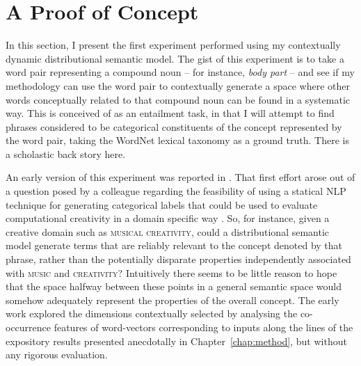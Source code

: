\section{A Proof of Concept}
In this section, I present the first experiment performed using my contextually dynamic distributional semantic model.  The gist of this experiment is to take a word pair representing a compound noun -- for instance, \emph{body part} -- and see if my methodology can use the word pair to contextually generate a space where other words conceptually related to that compound noun can be found in a systematic way.  This is conceived of as an entailment task, in that I will attempt to find phrases considered to be categorical constituents of the concept represented by the word pair, taking the WordNet lexical taxonomy as a ground truth.  There is a scholastic back story here.

An early version of this experiment was reported in \cite{AgresEA2015}.  That first effort arose out of a question posed by a colleague regarding the feasibility of using a statical NLP technique for generating categorical labels that could be used to evaluate computational creativity in a domain specific way \citep[for a psychological perspective on the difficulty of generating such terms in an objective way using human subjects, see][]{VanDerVeldeEA2015}.  So, for instance, given a creative domain such as \textsc{musical creativity}, could a distributional semantic model generate terms that are reliably relevant to the concept denoted by that phrase, rather than the potentially disparate properties independently associated with \textsc{music} and \textsc{creativity}?  Intuitively there seems to be little reason to hope that the space halfway between these points in a general semantic space would somehow adequately represent the properties of the overall concept.  The early work explored the dimensions contextually selected by analysing the co-occurrence features of word-vectors corresponding to inputs along the lines of the expository results presented anecdotally in Chapter~\ref{chap:method}, but without any rigorous evaluation.

